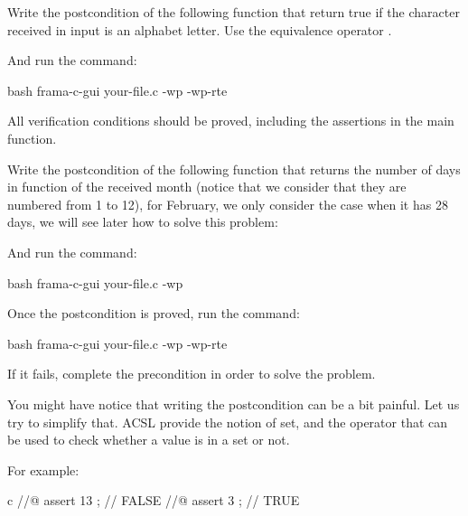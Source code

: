 Write the postcondition of the following function that return true if
the character received in input is an alphabet letter. Use the equivalence
operator \CodeInline{<==>}.





And run the command:


\begin{CodeBlock}{bash}
frama-c-gui your-file.c -wp -wp-rte
\end{CodeBlock}


All verification conditions should be proved, including the assertions in the
main function.






Write the postcondition of the following function that returns the number
of days in function of the received month (notice that we consider that
they are numbered from 1 to 12), for February, we only consider the case
when it has 28 days, we will see later how to solve this problem:





And run the command:


\begin{CodeBlock}{bash}
frama-c-gui your-file.c -wp
\end{CodeBlock}


Once the postcondition is proved, run the command:



\begin{CodeBlock}{bash}
frama-c-gui your-file.c -wp -wp-rte
\end{CodeBlock}



If it fails, complete the precondition in order to solve the problem.



You might have notice that writing the postcondition can be a bit painful.
Let us try to simplify that. ACSL provide the notion of set, and the operator
 that can be used to check whether a value is
in a set or not.


For example:


\begin{CodeBlock}{c}
//@ assert 13  ; // FALSE
//@ assert 3   ; // TRUE
\end{CodeBlock}



